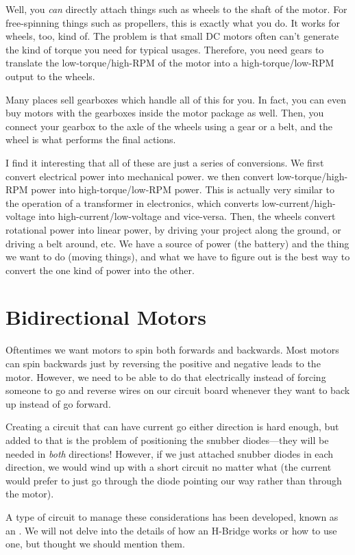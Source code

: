Well, you \emph{can} directly attach things such as wheels to the shaft of the motor.
For free-spinning things such as propellers, this is exactly what you do.
It works for wheels, too, kind of.
The problem is that small DC motors often can't generate the kind of torque you need for typical usages.
Therefore, you need gears to translate the low-torque/high-RPM of the motor into a high-torque/low-RPM output to the wheels.

Many places sell gearboxes which handle all of this for you.
In fact, you can even buy motors with the gearboxes inside the motor package as well.
Then, you connect your gearbox to the axle of the wheels using a gear or a belt, and the wheel is what performs the final actions.

I find it interesting that all of these are just a series of conversions.
We first convert electrical power into mechanical power.
we then convert low-torque/high-RPM power into high-torque/low-RPM power.
This is actually very similar to the operation of a transformer in electronics, which converts low-current/high-voltage into high-current/low-voltage and vice-versa.
Then, the wheels convert rotational power into linear power, by driving your project along the ground, or driving a belt around, etc.
We have a source of power (the battery) and the thing we want to do (moving things), and what we have to figure out is the best way to convert the one kind of power into the other.

\section{Bidirectional Motors}

Oftentimes we want motors to spin both forwards and backwards.
Most motors can spin backwards just by reversing the positive and negative leads to the motor.
However, we need to be able to do that electrically instead of forcing someone to go and reverse wires on our circuit board whenever they want to back up instead of go forward.

Creating a circuit that can have current go either direction is hard enough, but added to that is the problem of positioning the snubber diodes---they will be needed in \emph{both} directions!
However, if we just attached snubber diodes in each direction, we would wind up with a short circuit no matter what (the current would prefer to just go through the diode pointing our way rather than through the motor).

A type of circuit to manage these considerations has been developed, known as an .
We will not delve into the details of how an H-Bridge works or how to use one, but thought we should mention them.

